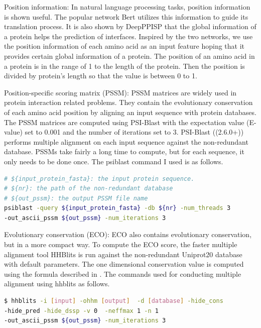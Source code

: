 Position information: In natural language processing tasks, position information is shown useful. The popular network Bert \cite{devlin2018bert} utilizes this information to guide its translation process. It is also shown by DeepPPISP \cite{zeng2019protein} that the global information of a protein helps the prediction of interfaces. Inspired by the two networks, we use the position information of each amino acid as an input feature hoping that it provides certain global information of a protein. The position of an amino acid in a protein is in the range of 1 to the length of the protein. Then the position is divided by protein's length so that the value is between 0 to 1.

Position-specific scoring matrix (PSSM): PSSM matrices are widely used in protein interaction related problems. They contain the evolutionary conservation of each amino acid position by aligning an input sequence with protein databases. The PSSM matrices are computed using PSI-Blast \cite{altschul1997gapped} with the expectation value (E-value) set to 0.001 and the number of iterations set to 3. PSI-Blast ((2.6.0+)) performs multiple alignment on each input sequence against the non-redundant database. PSSMs take fairly a long time to compute, but for each sequence, it only needs to be done once. The psiblast command I used is as follows.
\begin{lstlisting}[language=bash,frame=single]
# ${input_protein_fasta}: the input protein sequence.
# ${nr}: the path of the non-redundant database
# ${out_pssm}: the output PSSM file name
psiblast -query ${input_protein_fasta} -db ${nr} -num_threads 3
-out_ascii_pssm ${out_pssm} -num_iterations 3
\end{lstlisting}

Evolutionary conservation (ECO): ECO also contains evolutionary conservation, but in a more compact way. To compute the ECO score, the faster multiple alignment tool HHBlits \cite{remmert2012hhblits} is run against the non-redundant Uniprot20 database with default parameters. The one dimensional conservation value is computed using the formula described in \cite{zhang2019comprehensive}. The commands used for conducting multiple alignment using hhblits as follows.
\begin{lstlisting}[language=bash,frame=single]
$ hhblits -i [input] -ohhm [output]  -d [database] -hide_cons 
-hide_pred -hide_dssp -v 0  -neffmax 1 -n 1
-out_ascii_pssm ${out_pssm} -num_iterations 3
\end{lstlisting}

